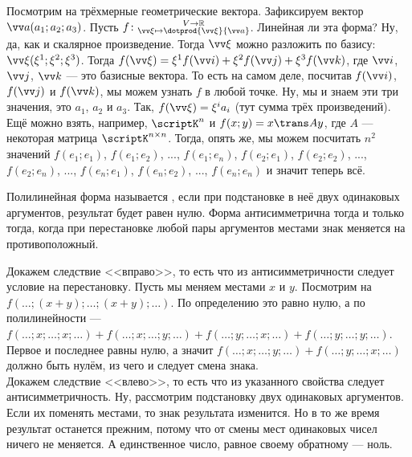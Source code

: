 \documentclass{article}
\let\vec\vv
\begin{document}
\begin{itemize}
        \begin{Example}
            Посмотрим на трёхмерные геометрические вектора. Зафиксируем вектор $\vec a(a_1;a_2;a_3)$. Пусть $f\colon\substack{V\to\mathbb R\\\vec\xi\mapsto\dotprod{\vec\xi}{\vec a}}$. Линейная ли эта форма? Ну, да, как и скалярное произведение. Тогда $\vec\xi$ можно разложить по базису: $\vec\xi(\xi^1;\xi^2;\xi^3)$. Тогда $f(\vec\xi)=\xi^1f(\vec i)+\xi^2f(\vec j)+\xi^3f(\vec k)$, где $\vec i$, $\vec j$, $\vec k$ --- это базисные вектора. То есть на самом деле, посчитав $f(\vec i)$, $f(\vec j)$ и $f(\vec k)$, мы можем узнать $f$ в любой точке. Ну, мы и знаем эти три значения, это $a_1$, $a_2$ и $a_3$. Так, $f(\vec\xi)=\xi^ia_i$ (тут сумма трёх произведений).\\
            Ещё можно взять, например, $\scriptK^n$ и $f(x;y)=x\trans Ay$, где $A$ --- некоторая матрица $\scriptK^{n\times n}$. Тогда, опять же, мы можем посчитать $n^2$ значений $f(e_1;e_1)$, $f(e_1;e_2)$, ..., $f(e_1;e_n)$, $f(e_2;e_1)$, $f(e_2;e_2)$, ..., $f(e_2;e_n)$, ..., $f(e_n;e_1)$, $f(e_n;e_2)$, ..., $f(e_n;e_n)$ и значит теперь всё.
        \end{Example}
        \dfn Полилинейная форма называется , если при подстановке в неё двух одинаковых аргументов, результат будет равен нулю.
        \thm Форма антисимметрична тогда и только тогда, когда при перестановке любой пары аргументов местами знак меняется на противоположный.
        \begin{Proof}
            Докажем следствие <<вправо>>, то есть что из антисимметричности следует условие на перестановку. Пусть мы меняем местами $x$ и $y$. Посмотрим на $f(\ldots;(x+y);\ldots;(x+y);\ldots)$. По определению это равно нулю, а по полилинейности --- $f(\ldots;x;\ldots;x;\ldots)+f(\ldots;x;\ldots;y;\ldots)+f(\ldots;y;\ldots;x;\ldots)+f(\ldots;y;\ldots;y;\ldots)$. Первое и последнее равны нулю, а значит $f(\ldots;x;\ldots;y;\ldots)+f(\ldots;y;\ldots;x;\ldots)$ должно быть нулём, из чего и следует смена знака.\\
            Докажем следствие <<влево>>, то есть что из указанного свойства следует антисимметричность. Ну, рассмотрим подстановку двух одинаковых аргументов. Если их поменять местами, то знак результата изменится. Но в то же время результат останется прежним, потому что от смены мест одинаковых чисел ничего не меняется. А единственное число, равное своему обратному --- ноль.
        \end{Proof}
        \begin{Comment}

\end{Comment}
\end{itemize}
\end{document}
